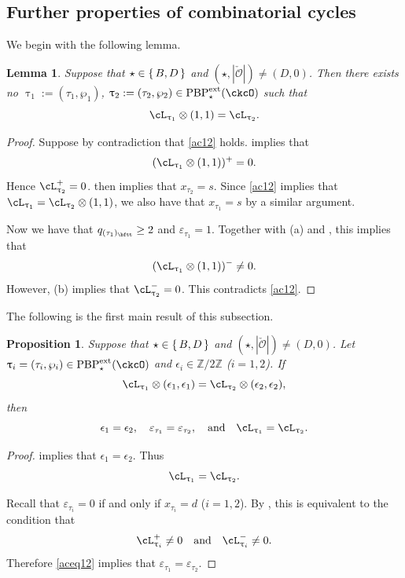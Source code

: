 \documentclass[11pt,a4paper]{amsart}
\def\abs#1{\left|{#1}\right|}
\newcommand{\CO}{{\mathcal {O}}}
\newcommand{\Z}{\mathbb{Z}}
\newcommand{\be}{\begin {equation}}
\newcommand{\ee}{\end {equation}}
\numberwithin{equation}{section}
\newtheorem{lem}[thm]{Lemma}
\newtheorem{prop}[thm]{Proposition}
\theoremstyle{remark}
\def\PBPe{\mathrm{PBP}^{\mathrm{ext}}}
\def\AND{\quad\text{and}\quad}
\def\ac{\cL}
\def\lotimes{\otimes}
\begin{document}
 \subsection{Further properties of combinatorial  cycles}\label{secfurth}

 We begin with the following lemma.
 \begin{lem}\label{lem:BD000}
Suppose that $\star \in \set{B,D}$ and $(\star, \abs{\check \CO})\neq (D, 0)$. Then there exists no  $\uptau_1:=(\tau_1,\wp_1)$, $\uptau_2:=(\tau_2,\wp_2)\in \PBPe_\star(\ckcO)$ such that
  \be\label{ac12}
    \ac_{\uptau_1}\lotimes (1,1)= \ac_{\uptau_2}.
  \ee
\end{lem}
\begin{proof}
Suppose by contradiction that \eqref{ac12} holds.  implies that
\[
(\ac_{\uptau_1}\lotimes (1,1))^+=0.
\]
Hence $\ac_{\uptau_2}^+=0$.  then implies that $x_{\tau_2}=s$. Since \eqref{ac12} implies that $\ac_{\uptau_1}= \ac_{\uptau_2}\lotimes (1,1)$, we also have that $x_{\tau_1}=s$ by a similar argument.

Now we have that $q_{(\tau_1)_\bftt}\geq 2$ and $\varepsilon_{\tau_1}=1$.  Together with   (a) and , this implies that
\[
(\ac_{\uptau_1}\lotimes (1,1))^- \neq 0.
\]
However,  (b) implies that $\ac_{\uptau_2}^-=0$. This contradicts \eqref{ac12}.
\end{proof}
 The following is the first main result of this subsection.

\begin{prop}\label{lem:BD1111}
Suppose that $\star \in \set{B,D}$ and $(\star, \abs{\check \CO})\neq (D, 0)$. Let $\uptau_i=(\tau_i, \wp_i)\in \PBPe_\star(\ckcO)$ and
  $\epsilon_i\in \Z/2\Z$ ($i=1,2$). If
  \[
    \ac_{\uptau_1}\lotimes (\epsilon_{1},\epsilon_{1})= \ac_{\uptau_2}\lotimes( \epsilon_{2},\epsilon_{2} ),
  \]
  then
  \[
    \epsilon_1=\epsilon_2,\quad \varepsilon_{\tau_1}=\varepsilon_{\tau_2}, \AND \ac_{\uptau_{1}}=\ac_{\uptau_{2}}.
  \]
\end{prop}

\begin{proof}
 implies that $\epsilon_{1}=\epsilon_{2}$. Thus
\be\label{aceq12}
  \ac_{\uptau_{1}}=\ac_{\uptau_{2}}.
\ee

Recall that $\varepsilon_{\tau_i}=0$ if and only if $x_{\tau_i}=d$ ($i=1,2$). By , this is equivalent to the condition that
\[
  \ac_{\uptau_{i}}^+\neq 0\quad \textrm{and}\quad \ac_{\uptau_{i}}^-\neq 0.
\]
Therefore \eqref{aceq12} implies that  $\varepsilon_{\tau_1}=\varepsilon_{\tau_2}$.
\end{proof}
\end{document}
